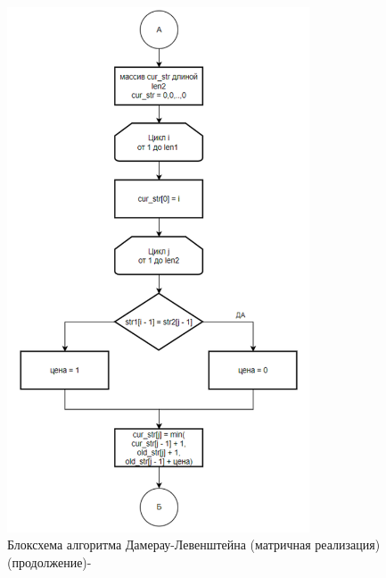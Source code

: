 \begin{figure}[H]
    \centering
    \includegraphics[width=0.8\textwidth]{img/block_2_1_2.png}
    \caption{Блоксхема алгоритма Дамерау-Левенштейна (матричная реализация) (продолжение)-}
\end{figure}

